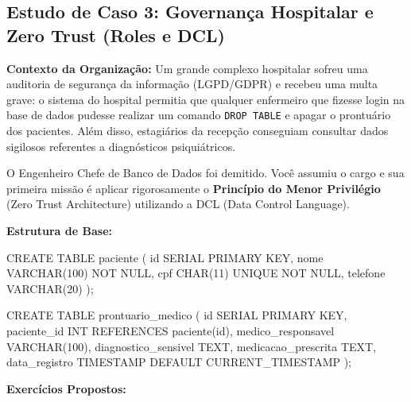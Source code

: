 \subsection{Estudo de Caso 3: Governança Hospitalar e Zero Trust (Roles e DCL)}

\textbf{Contexto da Organização:}
Um grande complexo hospitalar sofreu uma auditoria de segurança da informação (LGPD/GDPR) e recebeu uma multa grave: o sistema do hospital permitia que qualquer enfermeiro que fizesse login na base de dados pudesse realizar um comando \texttt{DROP TABLE} e apagar o prontuário dos pacientes. Além disso, estagiários da recepção conseguiam consultar dados sigilosos referentes a diagnósticos psiquiátricos.

O Engenheiro Chefe de Banco de Dados foi demitido. Você assumiu o cargo e sua primeira missão é aplicar rigorosamente o \textbf{Princípio do Menor Privilégio} (Zero Trust Architecture) utilizando a DCL (Data Control Language).

\textbf{Estrutura de Base:}
\begin{sqlcode}
CREATE TABLE paciente (
    id SERIAL PRIMARY KEY,
    nome VARCHAR(100) NOT NULL,
    cpf CHAR(11) UNIQUE NOT NULL,
    telefone VARCHAR(20)
);

CREATE TABLE prontuario_medico (
    id SERIAL PRIMARY KEY,
    paciente_id INT REFERENCES paciente(id),
    medico_responsavel VARCHAR(100),
    diagnostico_sensivel TEXT,
    medicacao_prescrita TEXT,
    data_registro TIMESTAMP DEFAULT CURRENT_TIMESTAMP
);
\end{sqlcode}

\textbf{Exercícios Propostos:}

